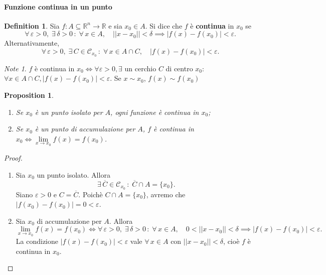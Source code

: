 \documentclass{article}
\theoremstyle{plain}
\newtheorem{prop}[thm]{Proposition}
\theoremstyle{definition}
\newtheorem{defn}{Definition}[section]
\theoremstyle{remark}
\newtheorem{note}{Note}
\begin{document}
\paragraph{Funzione continua in un punto}
\begin{bxthm}
\begin{defn}
    Sia $f:A\subseteq\mathbb{R}^n\to\mathbb{R}$ e sia $x_0\in A$. 
    Si dice che $f$ è \textbf{continua} in $x_0$ se 
    \[\forall\,\varepsilon>0,\;\exists\,\delta>0\,:\;\forall\, x\in A,\quad|| x-x_0 ||<\delta \implies|f(x)-f(x_0)|<\varepsilon.\]
    Alternativamente, 
    \[\forall\,\varepsilon>0,\;\exists\,C\in\mathcal{C}_{x_0}\,:\;\forall\, x\in A\cap C,\quad|f(x)-f(x_0)|<\varepsilon.\]
\end{defn}
\end{bxthm}

\vspace{10pt}

\begin{note}
$f$ è continua in $x_0 \iff \forall\varepsilon>0,\exists$ un cerchio $C$ di centro $x_0$: 
$\forall x\in A\cap C, |f(x)-f(x_0)|<\varepsilon.$
Se $x\sim x_0$, $f(x)\sim f(x_0)$
\end{note}

\vspace{10pt}

\begin{bxthm}
\begin{prop}\hfill
\begin{enumerate}
    \item Se $x_0$ è un punto isolato per $A$, ogni funzione è continua in $x_0$;
    \item Se $x_0$ è un punto di accumulazione per $A$, $f$ è continua in $x_0 \iff \lim\limits_{x\to x_0}f(x)=f(x_0)$.
\end{enumerate}
\end{prop}
\end{bxthm}
\begin{proof}\hfill 
    \begin{enumerate}
        \item Sia $x_0$ un punto isolato. Allora 
        \[\exists\,\overline{C}\in\mathcal{C}_{x_0}\,:\;\overline{C}\cap A=\{x_0\}.\]
        Siano $\varepsilon>0$ e  $C=\overline{C}$. Poichè $C\cap A=\{x_0\}$, avremo che $|f(x_0)-f(x_0)|=0<\varepsilon$.
        \item Sia $x_0$ di accumulazione per $A$. Allora 
        \[\lim_{x\to x_0} f(x)=f(x_0)\iff \forall\,\varepsilon>0,\;\exists\,\delta>0\,:\; \forall\, x\in A,\quad 0<||x-x_0||<\delta\implies |f(x)-f(x_0)|<\varepsilon.\] 
        La condizione $|f(x)-f(x_0)|<\varepsilon$ vale $\forall\, x\in A$ con $|| x-x_0 ||<\delta$, cioè $f$ è continua in $x_0$.
    \end{enumerate}
\end{proof}
\end{document}
